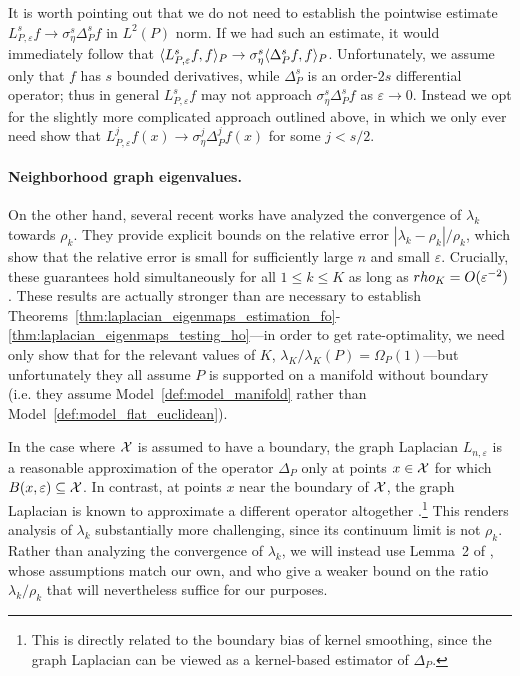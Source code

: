 It is worth pointing out that we do not need to establish the pointwise estimate $L_{P,\varepsilon}^sf \to \sigma_{\eta}^s\Delta_{P}^sf$ in $L^2(P)$ norm. If we had such an estimate, it would immediately follow that $\langle L_{P,\varepsilon}^sf, f \rangle_{P} \to \sigma_{\eta}^s\langle \Delta_P^sf, f \rangle_{P}$. Unfortunately, we assume only that $f$ has $s$ bounded derivatives, while $\Delta_P^s$ is an order-$2s$ differential operator; thus in general $L_{P,\varepsilon}^sf$ may not approach $\sigma_{\eta}^s\Delta_{P}^sf$ as $\varepsilon \to 0$. Instead we opt for the slightly more complicated approach outlined above, in which we only ever need show that $L_{P,\varepsilon}^jf(x) \to \sigma_{\eta}^j \Delta_P^jf(x)$ for some $j < s/2$. 

\paragraph{Neighborhood graph eigenvalues.}
On the other hand, several recent works \citep{burago2014,garciatrillos18,calder2019} have analyzed the convergence of $\lambda_{k}$ towards $\rho_k$. They provide explicit bounds on the relative error $|\lambda_{k} - \rho_k|/\rho_k$, which show that the relative error is small for sufficiently large $n$ and small $\varepsilon$. Crucially, these guarantees hold simultaneously for all $1 \leq k \leq K$ as long as $\\rho_K = O(\varepsilon^{-2})$. These results are actually stronger than are necessary to establish Theorems~\ref{thm:laplacian_eigenmaps_estimation_fo}-\ref{thm:laplacian_eigenmaps_testing_ho}---in order to get rate-optimality, we need only show that for the relevant values of $K$, $\lambda_{K}/\lambda_K(P) = \Omega_P(1)$---but unfortunately they all assume $P$ is supported on a manifold without boundary (i.e. they assume Model~\ref{def:model_manifold} rather than Model~\ref{def:model_flat_euclidean}). 

In the case where $\mathcal{X}$ is assumed to have a boundary, the graph Laplacian $L_{n,\varepsilon}$ is a reasonable approximation of the operator $\Delta_P$ only at points $x \in \mathcal{X}$ for which $B(x,\varepsilon) \subseteq \mathcal{X}$. In contrast, at points $x$ near the boundary of $\mathcal{X}$, the graph Laplacian is known to approximate a different operator altogether \citep{belkin2012}.\footnote{This is directly related to the boundary bias of kernel smoothing, since the graph Laplacian can be viewed as a kernel-based estimator of $\Delta_P$.} This renders analysis of $\lambda_k$ substantially more challenging, since its continuum limit is not $\rho_k$.  Rather than analyzing the convergence of $\lambda_k$, we will instead use Lemma~2 of \cite{green2021}, whose assumptions match our own, and who give a weaker bound on the ratio $\lambda_k/\rho_k$ that will nevertheless suffice for our purposes. 


